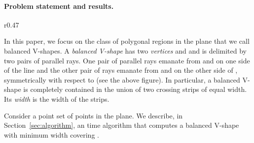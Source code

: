 \documentclass{llncs}
\begin{document}
\paragraph*{Problem statement and results.}
\begin{wrapfigure}[9]{r}{0.47\textwidth}
\end{wrapfigure}
In this paper, we focus on the class of polygonal regions in the plane
that we call balanced V-shapes.   
A \emph{balanced V-shape} has 
two \emph{vertices}  and  and is delimited by two pairs of
parallel rays. 
One pair of 
parallel rays emanate from  and  on one side of
the line  and the other pair of rays emanate from  and  on
the other side of , symmetrically with respect to   
(see the above figure).
In particular, a balanced V-shape is completely contained in the union
of two crossing strips of equal width.  Its \emph{width} is the width
of the strips.

Consider a point set  of  points in the plane.  
We describe, in Section~\ref{sec:algorithm}, an  time 
algorithm that computes a balanced V-shape with minimum width covering . 
\end{document}
